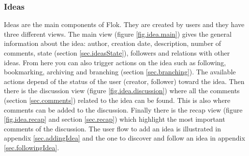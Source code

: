\documentclass[a4paper,12pt,twoside]{article}
\begin{document}
\subsubsection{Ideas}
Ideas are the main components of Flok.
They are created by users and they have three different views.
The main view (figure \ref{fig.idea.main}) gives the general information about the idea: author, creation date, description, number of comments, state (section \ref{sec.ideasState}), followers and relations with other ideas.
From here you can also trigger actions on the idea such as following, bookmarking, archiving and branching (section \ref{sec.branching}).
The available actions depend of the status of the user (creator, follower) toward the idea.
Then there is the discussion view (figure \ref{fig.idea.discussion}) where all the comments (section \ref{sec.comments}) related to the idea can be found.
This is also where comments can be added to the discussion.
Finally there is the recap view (figure \ref{fig.idea.recap} and section \ref{sec.recap}) which highlight the most important comments of the discussion.
The user flow to add an idea is illustrated in appendix \ref{sec.addingIdea} and the one to discover and follow an idea in appendix \ref{sec.followingIdea}.
\end{document}
